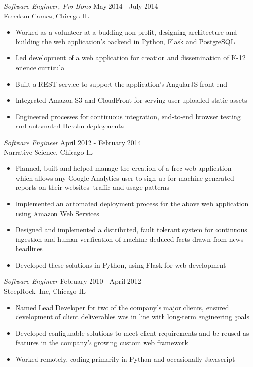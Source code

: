 \documentclass[line,margin]{res}
\begin{document}
\begin{resume}
        {\sl Software Engineer, Pro Bono} \hfill May 2014 - July 2014 \\
        Freedom Games, Chicago IL
        \begin{itemize}
        \item Worked as a volunteer at a budding non-profit, designing
          architecture and building the web application's backend in
          Python, Flask and PostgreSQL
        \item Led development of a web application for creation and
          dissemination of K-12 science curricula
        \item Built a REST service to support the application's AngularJS
          front end
        \item Integrated Amazon S3 and CloudFront for serving
          user-uploaded static assets
        \item Engineered processes for continuous integration, end-to-end
          browser testing and automated Heroku deployments
        \end{itemize}

        {\sl Software Engineer} \hfill April 2012 - February 2014 \\
        Narrative Science, Chicago IL
        \begin{itemize}
        \item Planned, built and helped manage the creation of a
          free web application which allows any Google Analytics
          user to sign up for machine-generated reports on their
          websites' traffic and usage patterns
        \item Implemented an automated deployment process for the
          above web application using Amazon Web Services
        \item Designed and implemented a distributed, fault tolerant
          system for continuous ingestion and human verification of
          machine-deduced facts drawn from news headlines
        \item Developed these solutions in Python, using Flask for
          web development
        \end{itemize}

        {\sl Software Engineer} \hfill February 2010 - April 2012 \\
        SteepRock, Inc, Chicago IL
        \begin{itemize}
        \item Named Lead Developer for two of the company's major
          clients, ensured development of client
          deliverables was in line with long-term engineering goals
        \item Developed configurable solutions to meet client
          requirements and be reused as features in the company's
          growing custom web framework
        \item Worked remotely, coding primarily in Python and
          occasionally Javascript
        \end{itemize}


\end{resume}
\end{document}

